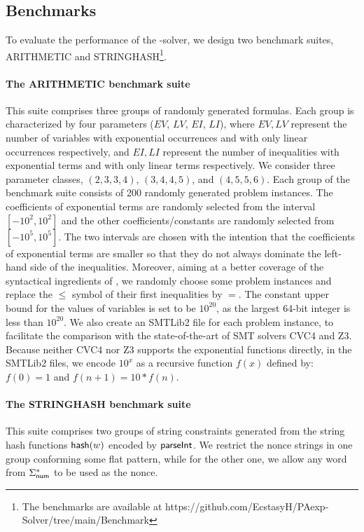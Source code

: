 \subsection{Benchmarks}

To evaluate the performance of the {\paexp}-solver, we design two benchmark suites, ARITHMETIC and STRINGHASH\footnote{The benchmarks are available at https://github.com/EcstasyH/PAexp-Solver/tree/main/Benchmark}.

\paragraph{The ARITHMETIC benchmark suite} 
This suite comprises three groups of randomly generated {\paexp} formulas. Each group is characterized by four parameters ($EV$, $LV$, $EI$, $LI$), where $EV, LV$ represent the number of variables with exponential occurrences and with only linear occurrences respectively, and $EI, LI$ represent the number of inequalities with exponential terms and with only linear terms respectively. 
We consider three parameter classes, $(2, 3, 3, 4)$, $(3, 4, 4, 5)$, and $(4, 5, 5, 6)$. 
Each group of the benchmark suite consists of 200 randomly generated problem instances. The coefficients of exponential terms are randomly selected from the interval $[-10^2, 10^2]$ and the other coefficients/constants are randomly selected from $[-10^5, 10^5]$. The two intervals are chosen with the intention that the coefficients of exponential terms are smaller so that they do not always dominate the left-hand side of the inequalities. Moreover, aiming at a better coverage of the syntactical ingredients of {\paexp}, we randomly choose some problem instances and replace the $\le$ symbol of their first inequalities by $=$. The constant upper bound for the values of variables is set to be $10^{20}$, as the largest 64-bit integer is less than $10^{20}$. We also create an SMTLib2 file for each problem instance, to facilitate the comparison with the state-of-the-art of SMT solvers CVC4 and Z3. Because neither CVC4 nor Z3 supports the exponential functions directly, in the SMTLib2 files, we encode $10^x$ as a recursive function $f(x)$ defined by: $f(0) = 1$ and $f(n+1) = 10*f(n)$.

%

\paragraph{The STRINGHASH benchmark suite} 
This suite comprises two groups of string constraints generated from the string hash functions ${\sf hash}(w)$ encoded by $\textsf{parseInt}$.
We restrict the nonce strings in one group conforming some flat pattern, while for the other one, we allow any word from $\Sigma^*_{\sf num}$ to be used as the nonce.

